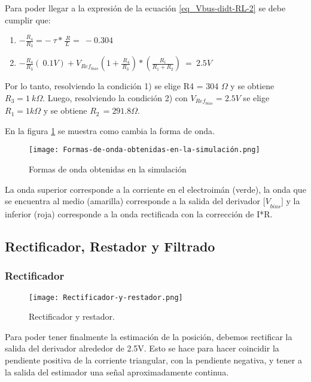 \noindent Para poder llegar a la expresi\'{o}n de la ecuaci\'{o}n \ref{eq_Vbus-didt-RL-2} se debe cumplir que:

\begin{enumerate}
	\item  $-\frac{R_4}{R_3}=-\ \tau *\frac{\ R}{L}=\ -0.304$  
	
	\item  $-\frac{R_4}{R_3}(\ 0.1V)+V_{Ref_{bias}}(1+\frac{\ R_4}{R_3})*(\frac{R_1}{R_1+R_2})\ =\ 2.5V$     
\end{enumerate}

\noindent Por lo tanto, resolviendo la condici\'{o}n 1) se elige R4 = 304 $\mathit{\Omega}$ y se obtiene $R_3=1\ k\mathit{\Omega}$. Luego, resolviendo la condici\'{o}n 2) con $V_{Ref_{bias}}=2.5V$ se elige $R_1=1k\mathit{\Omega}$ y se obtiene $R_{2\ }=291.8\mathit{\Omega}.$

\noindent En la figura \ref{fig:img_Formas_de_onda_obtenidas_en_la_simulación} se muestra como cambia la forma de onda.

\begin{figure}[H]
	\centering
	\texttt{[image: Formas-de-onda-obtenidas-en-la-simulación.png]}
	\caption{Formas de onda obtenidas en la simulación}
	\label{fig:img_Formas_de_onda_obtenidas_en_la_simulación}
\end{figure}

\noindent La onda superior corresponde a la corriente en el electroim\'{a}n (verde), la onda que se encuentra al medio (amarilla) corresponde a la salida del derivador ${[V}_{bias}$$]$ y la inferior (roja) corresponde a la onda rectificada con la correcci\'{o}n de I*R.

\subsection{Rectificador, Restador y Filtrado}

\subsubsection{Rectificador}

\begin{figure}[H]
	\centering
	\texttt{[image: Rectificador-y-restador.png]}
	\caption{Rectificador y restador.}
	\label{fig:img_Rectificador_y_restador}
\end{figure}

\noindent Para poder tener finalmente la estimaci\'{o}n de la posici\'{o}n, debemos rectificar la salida del derivador alrededor de 2.5V. Esto se hace para hacer coincidir la pendiente positiva de la corriente triangular, con la pendiente negativa, y tener a la salida del estimador una se\~{n}al aproximadamente continua.

